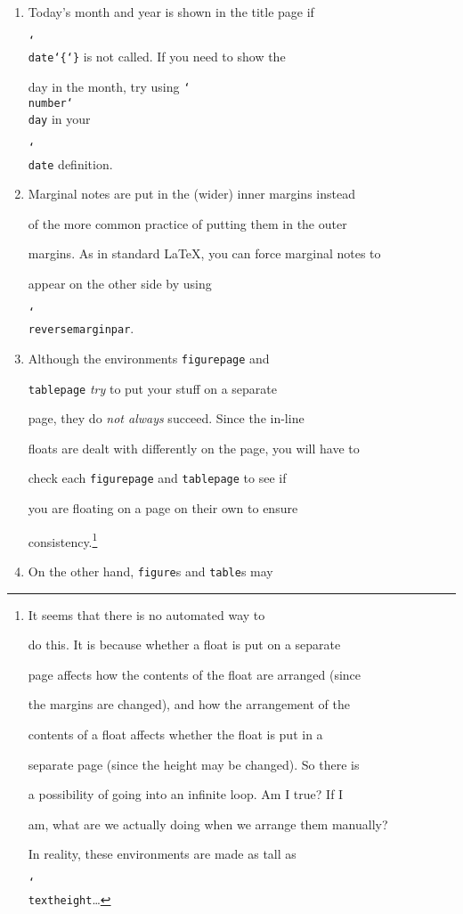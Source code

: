 \documentclass{bhamthesis}
\newcommand{\bksl}{\char`\\}
\newcommand{\cmd}[1]{\texttt{\bksl{}#1}}
\newcommand{\env}[1]{\texttt{#1}}
\newcommand{\textarg}{\char`\{\char`\}}
\begin{document}
\begin{enumerate}
\item Today's month and year is shown in the title page if

  \cmd{date\textarg} is not called.  If you need to show the

  day in the month, try using \cmd{number}\cmd{day} in your

  \cmd{date} definition.

\item Marginal notes are put in the (wider) inner margins instead

  of the more common practice of putting them in the outer

  margins.  As in standard \LaTeX, you can force marginal notes to

  appear on the other side by using

  \cmd{reversemarginpar}.

\item Although the environments \env{figurepage} and

  \env{tablepage} \emph{try} to put your stuff on a separate

  page, they do \emph{not always} succeed.  Since the in-line

  floats are dealt with differently on the page, you will have to

  check each \env{figurepage} and \env{tablepage} to see if

  you are floating on a page on their own to ensure

  consistency.\footnote{It seems that there is no automated way to

  do this.  It is because whether a float is put on a separate

  page affects how the contents of the float are arranged (since

  the margins are changed), and how the arrangement of the

  contents of a float affects whether the float is put in a

  separate page (since the height may be changed).  So there is

  a possibility of going into an infinite loop.  Am I true?  If I

  am, what are we actually doing when we arrange them manually?

  \par  In reality, these environments are made as tall as

  \cmd{textheight}\ldots}

\item On the other hand, \env{figure}s and \env{table}s may


\end{enumerate}
\end{document}
